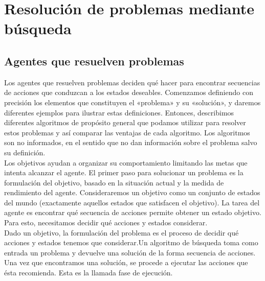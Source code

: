 \documentclass[12pt,a4paper]{report}
\begin{document}
\chapter{Resolución de problemas mediante búsqueda}
\section{Agentes que resuelven problemas}
Los agentes que resuelven problemas deciden qué hacer para encontrar secuencias de acciones que conduzcan a los estados deseables. Comenzamos definiendo con precisión los elementos que constituyen el «problema» y su «solución», y daremos diferentes ejemplos para ilustrar estas definiciones. Entonces, describimos diferentes algoritmos de propósito general que podamos utilizar para resolver estos problemas y así comparar las ventajas de cada algoritmo. Los algoritmos son no informados, en el sentido que no dan información sobre el problema salvo su definición.\\Los objetivos ayudan a organizar su comportamiento limitando las metas que intenta alcanzar el agente. El primer paso para solucionar un problema es la formulación del objetivo, basado en la situación actual y la medida de rendimiento del agente. Consideraremos un objetivo como un conjunto de estados del mundo (exactamente aquellos estados que satisfacen el objetivo). La tarea del agente es encontrar qué secuencia de acciones permite obtener un estado objetivo. Para esto, necesitamos decidir qué acciones y estados considerar.\\Dado un objetivo, la formulación del problema es el proceso de decidir qué acciones y estados tenemos que considerar.Un algoritmo de búsqueda toma como entrada un problema y devuelve una solución de la forma secuencia de acciones. Una vez que encontramos una solución, se procede a ejecutar las acciones que ésta recomienda. Esta es la llamada fase de ejecución.
\end{document}
